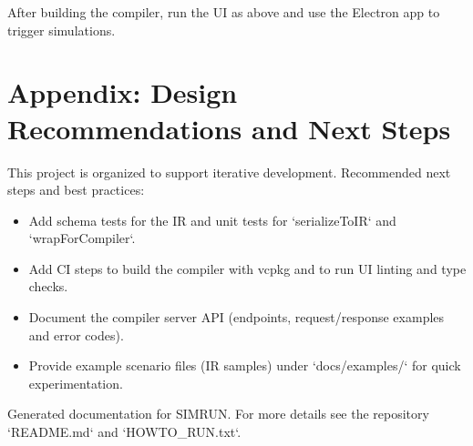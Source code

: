\documentclass[11pt,a4paper]{article}
\begin{document}
After building the compiler, run the UI as above and use the Electron app to trigger simulations.

\newpage

\section{Appendix: Design Recommendations and Next Steps}

This project is organized to support iterative development. Recommended next steps and best practices:

\begin{itemize}
  \item Add schema tests for the IR and unit tests for `serializeToIR` and `wrapForCompiler`.
  \item Add CI steps to build the compiler with vcpkg and to run UI linting and type checks.
  \item Document the compiler server API (endpoints, request/response examples and error codes).
  \item Provide example scenario files (IR samples) under `docs/examples/` for quick experimentation.
\end{itemize}

\vfill
\begin{center}
  Generated documentation for SIMRUN. For more details see the repository `README.md` and `HOWTO_RUN.txt`.
\end{center}
\end{document}
